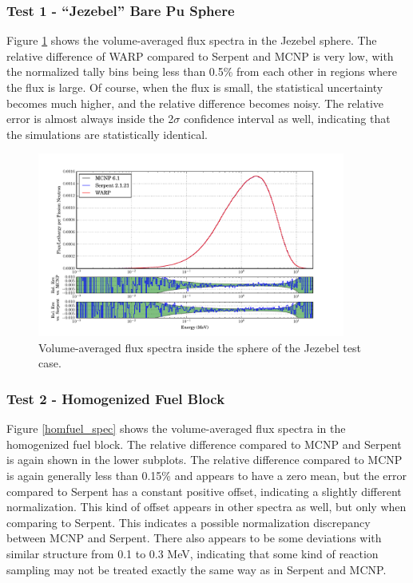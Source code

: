\documentclass[preprint,12pt]{elsarticle}
\begin{document}
\newpage
\subsubsection{Test 1 - ``Jezebel'' Bare Pu Sphere}

Figure \ref{jezebel_spec} shows the volume-averaged flux spectra in the Jezebel sphere.  The relative difference of WARP compared to Serpent and MCNP is very low, with the normalized tally bins being less than 0.5\% from each other in regions where the flux is large.  Of course, when the flux is small, the statistical uncertainty becomes much higher, and the relative difference becomes noisy.   The relative error is almost always inside the 2$\sigma$ confidence interval as well, indicating that the simulations are statistically identical.  

\begin{figure}[h!]
\centering
\includegraphics[width=0.9\textwidth,trim= 1cm 0cm 1cm 0cm]{graphics/jezebel_spec.pdf}
\caption{Volume-averaged flux spectra inside the sphere of the Jezebel test case. \label{jezebel_spec} }
\end{figure}

\newpage
\subsubsection{Test 2 - Homogenized Fuel Block}

Figure \ref{homfuel_spec} shows the volume-averaged flux spectra in the homogenized fuel block.  The relative difference compared to MCNP and Serpent is again shown in the lower subplots.  The relative difference compared to MCNP is again generally less than 0.15\% and appears to have a zero mean, but the error compared to Serpent has a constant positive offset, indicating a slightly different normalization.  This kind of offset appears in other spectra as well, but only when comparing to Serpent.  This indicates a possible normalization discrepancy between MCNP and Serpent.  There also appears to be some  deviations with similar structure from 0.1 to 0.3 MeV, indicating that some kind of reaction sampling may not be treated exactly the same way as in Serpent and MCNP.
\end{document}
